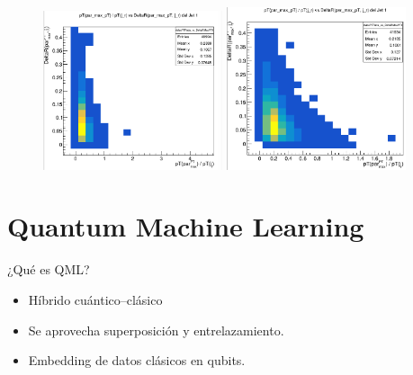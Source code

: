 \documentclass{beamer}
\begin{document}
\begin{frame}
    \begin{figure}
    \centering
    \includegraphics[width=0.47\textwidth]{lowptjet.png}
    \includegraphics[width=0.47\textwidth]{higptjet.png}
  \end{figure}
\end{frame}

\section{Quantum Machine Learning}
\begin{frame}{¿Qué es QML?}
  \begin{itemize}
    \item Híbrido cuántico–clásico
    \item Se aprovecha superposición y entrelazamiento.
    \item Embedding de datos clásicos en qubits.
  \end{itemize}
\end{frame}
\end{document}
